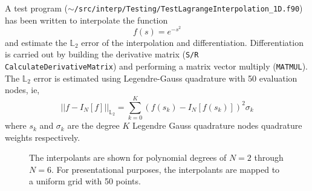 \documentclass[12pt]{softwaremanual}
\begin{document}
 A test program (\texttt{$\sim$/src/interp/Testing/TestLagrangeInterpolation\_1D.f90}) has been written to interpolate the function 
 \begin{equation}
 f(s) = e^{-s^2}
 \end{equation}
 and estimate the $\mathbb{L}_2$ error of the interpolation and differentiation. Differentiation is carried out by building the derivative matrix (\texttt{S/R CalculateDerivativeMatrix}) and performing a matrix vector multiply (\texttt{MATMUL}). The $\mathbb{L}_2$ error is estimated using Legendre-Gauss quadrature with 50 evaluation nodes, ie, 
 \begin{equation}
 || f - I_N[f] ||_{\mathbb{L}_2} = \sum_{k=0}^K \left( f(s_k) - I_N[f(s_k)] \right)^2 \sigma_k
 \end{equation}
 where $s_k$ and $\sigma_k$ are the degree $K$ Legendre Gauss quadrature nodes quadrature weights respectively. 
 
\begin{figure}
\begin{center}

   \caption{ The interpolants are shown for polynomial degrees of $N=2$ through $N=6$. For presentational purposes, the interpolants are mapped to a uniform grid with 50 points.  }\label{fig:GaussianFunction}
\end{center}
\end{figure}  
\end{document}

